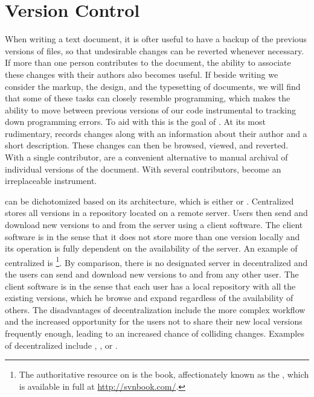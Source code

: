 \documentclass{book}
\begin{document}
\section{Version Control}\label{sec:vcs}
When writing a text document, it is ofter useful to have a backup of the
previous versions of files, so that undesirable changes can be reverted whenever
necessary. If more than one person contributes to the document, the ability to
associate these changes with their authors also becomes useful. If beside
writing we consider the markup, the design, and the typesetting of documents, we
will find that some of these tasks can closely resemble programming, which makes
the ability to move between previous versions of our code instrumental to
tracking down programming errors. To aid with this is the goal of .
At its most rudimentary,  records changes along with an information
about their author and a short description. These changes can then be browsed,
viewed, and reverted. With a single contributor,  are a convenient
alternative to manual archival of individual versions of the document. With
several contributors,  become an irreplaceable instrument.

 can be dichotomized based on its architecture, which is either
 or . Centralized  stores
all versions in a repository located on a remote server. Users then send and
download new versions to and from the server using a client software. The client
software is  in the sense that it does not store more than one
version locally and its operation is fully dependent on the availability of the
server. An example of centralized  is \footnote{
  The authoritative resource on  is the  book, affectionately known as the , which is
  available in full at \url{http://svnbook.com/}.
}. By comparison,
there is no designated server in decentralized  and the users can
send and download new versions to and from any other user. The client software
is  in the sense that each user has a local repository with all the
existing versions, which he browse and expand regardless of the availability of
others. The disadvantages of decentralization include the more complex workflow
and the increased opportunity for the users not to share their new local
versions frequently enough, leading to an increased chance of colliding changes.
Examples of decentralized  include , , or
.
\end{document}
